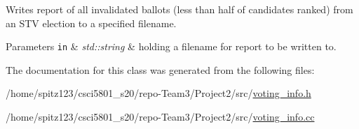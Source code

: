 Writes report of all invalidated ballots (less than half of candidates ranked) from an S\+TV election to a specified filename. 


\begin{DoxyParams}[1]{Parameters}
\mbox{\tt in}  & {\em std\+::string} & holding a filename for report to be written to. \\
\hline
\end{DoxyParams}


The documentation for this class was generated from the following files\+:\begin{DoxyCompactItemize}
\item 
/home/spitz123/csci5801\+\_\+s20/repo-\/\+Team3/\+Project2/src/\hyperlink{voting__info_8h}{voting\+\_\+info.\+h}\item 
/home/spitz123/csci5801\+\_\+s20/repo-\/\+Team3/\+Project2/src/\hyperlink{voting__info_8cc}{voting\+\_\+info.\+cc}\end{DoxyCompactItemize}
